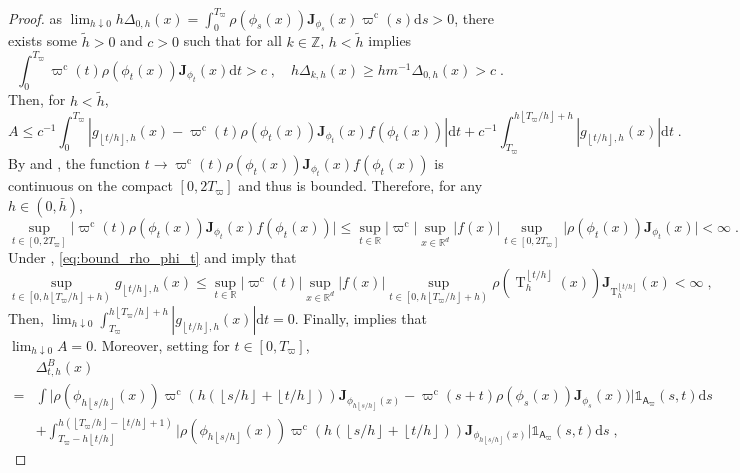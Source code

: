 \documentclass{article}
\def\transfo{\operatorname{T}}
\def\rmd{\operatorname{d}\hspace{-2pt}}
\def\rset{\mathbb{R}}
\def\rmd{\mathrm{d}}
\def\eqsp{\,}
\def\msa{\mathsf{A}}
\newcommand{\absLigne}[1]{\vert #1 \vert}
\def\eqsp{\;}
\newcommand{\coint}[1]{\left[#1\right)}
\newcommand{\ooint}[1]{\left(#1\right)}
\newcommand{\ccint}[1]{\left[#1\right]}
\newcommand{\1}{\mathds{1}}
\def\proposal{\rho}
\def\Jac{\mathbf{J}}
\newcommand{\JacOp}[1]{\Jac_{#1}}
\def\msa{\mathsf{A}}
\def\rset{\mathbb{R}}
\def\zset{\mathbb{Z}}
\def\rmd{\mathrm{d}}
\def\varpic{\varpi^{\mathrm{c}}}
\newcommand{\partint}[1]{ \left \lfloor #1 \right \rfloor}
\def\Tvarpi{T_\varpi}
\begin{document}
\begin{proof}
 as $ \lim_{h\downarrow0}h\Delta_{0,h}(x)= \int_0^{\Tvarpi} \proposal(\phi_s(x))\JacOp{\phi_s}(x)\varpic(s)\rmd s>0$, there exists some $\tilde h>0$ and $c>0$ such that for all $k\in\zset$, $h<\tilde h$ implies 
 \begin{equation}
 \label{eq:majoration_delta}
\int_0^{\Tvarpi}\varpic(t)\proposal(\phi_t(x))\JacOp{\phi_t}(x)\rmd t>c\eqsp, \quad h\Delta_{k,h}(x) \geq hm^{-1}\Delta_{0,h}(x)>c\eqsp.
 \end{equation}
 Then, for $h<\tilde h$,
$$
 A \leq c^{-1} \int_{0}^{\Tvarpi} |g_{\partint{t/h}, h}(x) -  \varpic(t)\proposal(\phi_t(x))\JacOp{\phi_t}(x)f(\phi_t(x))|\rmd t +  c^{-1}\int_{\Tvarpi}^{h\partint{\Tvarpi/h}+h} \left\vert g_{\partint{t/h}, h}(x)\right\vert\rmd t\eqsp.
$$
By  and , the function $t\to \varpic(t)\proposal(\phi_t(x))\JacOp{\phi_t}(x)f(\phi_t(x))$ is continuous on the compact $[0, {2\Tvarpi}]$ and thus is bounded. Therefore, for any $h\in\ooint{0,\bar h}$,
\begin{equation}
\label{eq:bound_rho_phi_t}
\sup_{t\in\ccint{0, 2\Tvarpi}} \absLigne{\varpic(t)\proposal(\phi_{t}(x))\JacOp{\phi_{t}}(x)f(\phi_t(x))}
\leq\sup_{t\in\rset}|\varpic|\sup_{x\in\rset^d}|f(x)| \sup_{t\in\ccint{0, 2\Tvarpi}}\absLigne{\proposal(\phi_t(x))\JacOp{\phi_t}(x)}<\infty\eqsp.
\end{equation} 
Under , \eqref{eq:bound_rho_phi_t} and  imply that
$$
  \sup_{t\in\coint{0, h\partint{\Tvarpi/h}+h}} g_{\partint{t/h}, h}(x)\leq \sup_{t\in\rset}|\varpic(t)|\sup_{x\in\rset^d}|f(x)| \sup_{t\in\coint{0, h\partint{\Tvarpi/h}+h}}\rho(\transfo_h^{\partint{t/h}}(x))\JacOp{\transfo_h^{\partint{t/h}}}(x)<\infty\eqsp,
$$
Then, $\lim_{ h \downarrow 0}\int_{\Tvarpi}^{h\partint{\Tvarpi/h}+h} \left\vert g_{\partint{t/h}, h}(x)\right\vert\rmd t = 0$. 
Finally,  implies  that $\lim_{h\downarrow0}A= 0$.  Moreover, setting
for $t\in\ccint{0, \Tvarpi}$,
   \begin{align}
   \label{eq:first_dominated}
   &\Delta^B_{t,h}(x)\\ 
   \nonumber =& \int \vert\proposal(\phi_{h\partint{s/h}}(x))\varpic(h(\partint{s/h} + \partint{t/h})) \JacOp{\phi_{h\partint{s/h}}(x)} - \varpic(s+t)\proposal(\phi_s(x))\JacOp{\phi_s}(x)) \vert\1_{\msa_\varpi}(s,t)\rmd s\\
  \nonumber &+ \int_{\Tvarpi-h\partint{t/h}}^{h(\partint{\Tvarpi/h}-\partint{t/h}+1)}\vert\proposal(\phi_{h\partint{s/h}}(x))\varpic(h(\partint{s/h} + \partint{t/h})) \JacOp{\phi_{h\partint{s/h}}(x)}\vert \1_{\msa_\varpi}(s,t) \rmd s \eqsp,

\end{align}
\end{proof}
\end{document}

